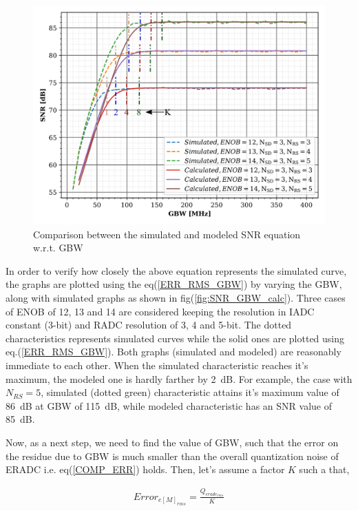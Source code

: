 \begin{figure}[ht]
    \centering
    \includegraphics[scale=.7]{Chap04/Figures/snr_vs_gbw_calc1.png}
    \caption{Comparison between the simulated and modeled SNR equation w.r.t. GBW}
    \label{fig:SNR_GBW_calc1}
\end{figure}


In order to verify how closely the above equation represents the simulated curve, the graphs are plotted using the eq(\ref{ERR_RMS_GBW}) by varying the GBW, along with simulated graphs as shown in fig(\ref{fig:SNR_GBW_calc}). Three cases of ENOB of 12, 13 and 14 are considered keeping the resolution in IADC constant (3-bit) and RADC resolution of 3, 4 and 5-bit. The dotted characteristics represents simulated curves while the solid ones are plotted using eq.(\ref{ERR_RMS_GBW}). Both graphs (simulated and modeled) are reasonably immediate to each other. When the simulated characteristic reaches it's maximum, the modeled one is hardly farther by 2~dB. For example, the case with $N_{RS}=5$, simulated (dotted green) characteristic attains it's maximum value of 86~dB at GBW of 115~dB, while modeled characteristic has an SNR value of 85~dB.

Now, as a next step, we need to find the value of GBW, such that the error on the residue due to GBW is much smaller than the overall quantization noise of ERADC i.e. eq(\ref{COMP_ERR}) holds. Then, let's assume a factor $K$ such a that,

\begin{align*}
    Error_{e[M]_{rms}} = \frac{Q_{eradc_{rms}}}{K}
\end{align*}

